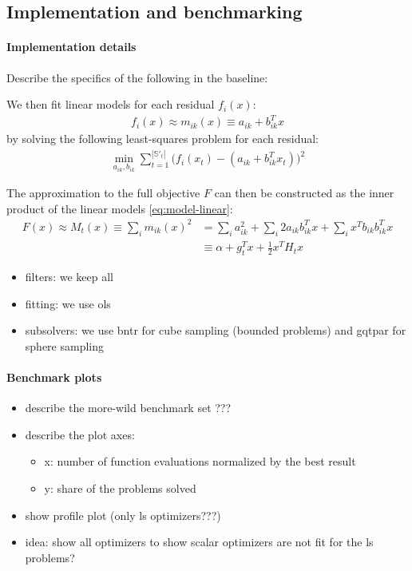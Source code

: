 \subsection{Implementation and benchmarking}

\paragraph{Implementation details} Describe the specifics of the following in the baseline:



We then fit linear models for each residual $f_i(x)$:
\begin{align}
    f_i(x)\approx m_{ik}(x) \equiv a_{ik}+b_{ik}^Tx
    \label{eq:model-linear}
\end{align}
by solving the following least-squares problem for each residual:
\begin{align}
    \min\limits_{a_{ik},b_{ik}}\sum\limits_{t=1}^{|\mathbb{S}'_t|}\big(f_i(x_t)-(a_{ik}+b_{ik}^Tx_t)\big)^2
    \label{eq:fit-linear}
\end{align}




The approximation to the full objective $F$ can then be constructed as the inner product of the linear models \ref{eq:model-linear}:
\begin{align}
    F(x)\approx M_t(x)\equiv\sum\limits_im_{ik}(x)^2 &= \sum\limits_i a_{ik}^2 + \sum\limits_i 2a_{ik} b_{ik}^T x + \sum_i x^T b_{ik}b_{ik}^T x\nonumber\\
    &\equiv \alpha + g_t^T x + \frac{1}{2} x^T H_t x
    \label{eq:model-full}
\end{align}

\begin{itemize}
    \item filters: we keep all
    \item fitting: we use ols
    \item subsolvers: we use bntr for cube sampling (bounded problems) and gqtpar for sphere sampling
\end{itemize}
\paragraph{Benchmark plots}
\begin{itemize}
    \item describe the more-wild benchmark set ???
    \item describe the plot axes:
        \begin{itemize}
            \item x: number of function evaluations normalized by the best result
            \item y: share of the problems solved
        \end{itemize}
    \item show profile plot (only ls optimizers???)
    \item idea: show all optimizers to show scalar optimizers are not fit for the ls problems?
\end{itemize}


